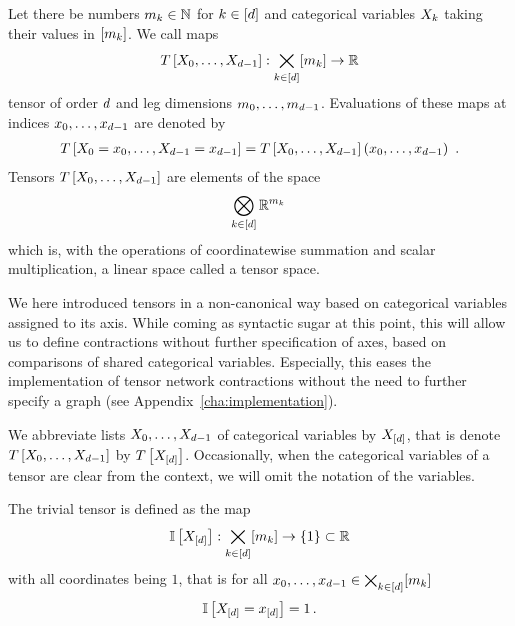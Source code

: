 \begin{definition}[Tensor]\label{def:tensor}
	Let there be numbers $m_{k}\in\mathbb{N}$ for $k\in[d]$ and categorical variables $X_{k}$ taking their values in $[m_{k}]$.
	We call maps
	\begin{align*}
		T\left[X_{0},\ldots,X_{d-1}\right] : \bigtimes_{k\in[d]} [m_{k}] \rightarrow \mathbb{R}
	\end{align*}
	tensor of order $d$ and leg dimensions $m_{0},\ldots,m_{d-1}$.
	Evaluations of these maps at indices $x_{0},\ldots,x_{d-1}$ are denoted by
	\begin{align*}
		\hypercoreat{\indexedcatvariables} = \hypercoreat{\catvariables}(\catindices) \, .
	\end{align*}
	Tensors $T\left[X_{0},\ldots,X_{d-1}\right]$ are elements of the space
	\begin{align*}
		\bigotimes_{k\in[d]} \mathbb{R}^{m_{k}} \,
	\end{align*}
	which is, with the operations of coordinatewise summation and scalar multiplication, a linear space called a tensor space.
\end{definition}

We here introduced tensors in a non-canonical way based on categorical variables assigned to its axis.
While coming as syntactic sugar at this point, this will allow us to define contractions without further specification of axes, based on comparisons of shared categorical variables.
Especially, this eases the implementation of tensor network contractions without the need to further specify a graph (see Appendix~\ref{cha:implementation}).

We abbreviate lists $X_{0},\ldots,X_{d-1}$ of categorical variables by $X_{[d]}$, that is denote $T\left[X_{0},\ldots,X_{d-1}\right]$ by $T\left[X_{[d]}\right]$.
Occasionally, when the categorical variables of a tensor are clear from the context, we will omit the notation of the variables. %

\begin{example}\label{exa:trivialTensor}
	The trivial tensor is defined as the map
		\[ \mathbb{I}\left[X_{[d]}\right] : \bigtimes_{k\in[d]}[m_{k}] \rightarrow \{1\} \subset \mathbb{R} \]
	with all coordinates being $1$, that is for all $x_{0},\ldots,x_{d-1}\in\bigtimes_{k\in[d]}[m_{k}]$
		\[ \mathbb{I}\left[X_{[d]}=x_{[d]}\right] = 1 \, . \]
\end{example}


